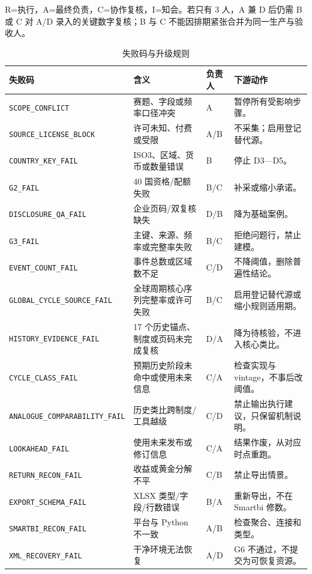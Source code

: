 \documentclass[UTF8,fontset=windows,12pt,openany]{ctexbook}
\newcommand{\Field}[1]{{\small\nolinkurl{#1}}}
\begin{document}
R=执行，A=最终负责，C=协作复核，I=知会。若只有 3 人，A 兼 D 后仍需 B 或 C 对 A/D 录入的关键数字复核；B 与 C 不能因排期紧张合并为同一生产与验收人。

\begin{longtable}{p{3.0cm}p{4.1cm}p{3.2cm}p{3.8cm}}
\caption{失败码与升级规则}\label{tab:failure-codes}\\
\toprule
\textbf{失败码} & \textbf{含义} & \textbf{负责人} & \textbf{下游动作}\\
\midrule
\Field{SCOPE_CONFLICT} & 赛题、字段或频率口径冲突 & A & 暂停所有受影响步骤。\\
\Field{SOURCE_LICENSE_BLOCK} & 许可未知、付费或受限 & A/B & 不采集；启用登记替代源。\\
\Field{COUNTRY_KEY_FAIL} & ISO3、区域、货币或数量错误 & B & 停止 D3—D5。\\
\Field{G2_FAIL} & 40 国资格/配额失败 & B/C & 补采或缩小承诺。\\
\Field{DISCLOSURE_QA_FAIL} & 企业页码/双复核缺失 & D/B & 降为基础案例。\\
\Field{G3_FAIL} & 主键、来源、频率或完整率失败 & B/C & 拒绝问题行，禁止建模。\\
\Field{EVENT_COUNT_FAIL} & 事件总数或区域数不足 & C/D & 不降阈值，删除普遍性结论。\\
\Field{GLOBAL_CYCLE_SOURCE_FAIL} & 全球周期核心序列完整率或许可失败 & B/C & 启用登记替代源或缩小规则适用期。\\
\Field{HISTORY_EVIDENCE_FAIL} & 17 个历史锚点、制度或页码未完成复核 & D/A & 降为待核验，不进入核心类比。\\
\Field{CYCLE_CLASS_FAIL} & 预期历史阶段未命中或使用未来信息 & C/A & 检查实现与 vintage，不事后改阈值。\\
\Field{ANALOGUE_COMPARABILITY_FAIL} & 历史类比跨制度/工具越级 & C/D & 禁止输出执行建议，只保留机制说明。\\
\Field{LOOKAHEAD_FAIL} & 使用未来发布或修订信息 & C/A & 结果作废，从对应时点重跑。\\
\Field{RETURN_RECON_FAIL} & 收益或黄金分解不平 & C/B & 禁止导出情景。\\
\Field{EXPORT_SCHEMA_FAIL} & XLSX 类型/字段/行数错误 & B/A & 重新导出，不在 Smartbi 修数。\\
\Field{SMARTBI_RECON_FAIL} & 平台与 Python 不一致 & A/B & 检查聚合、连接和类型。\\
\Field{XML_RECOVERY_FAIL} & 干净环境无法恢复 & A/D & G6 不通过，不提交为可恢复资源。\\
\bottomrule
\end{longtable}
\end{document}
